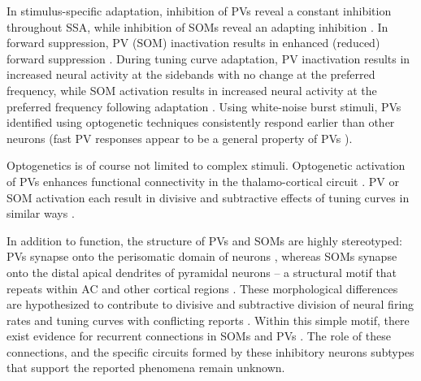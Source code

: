 \documentclass[a4paper,10pt]{article}
\begin{document}
In stimulus-specific adaptation, inhibition of PVs reveal a constant inhibition throughout SSA, while inhibition of SOMs reveal an adapting inhibition \cite{natan2015complementary}. In forward suppression, PV (SOM) inactivation results in enhanced (reduced) forward suppression \cite{phillips2017cortical}. During tuning curve adaptation, PV inactivation results in increased neural activity at the sidebands with no change at the preferred frequency, while SOM activation results in increased neural activity at the preferred frequency following adaptation \cite{natan2017cortical}. Using white-noise burst stimuli, PVs identified using optogenetic techniques consistently respond earlier than other neurons \cite{keller2018gap} (fast PV responses appear to be a general property of PVs \cite{li2014feedforward}).

Optogenetics is of course not limited to complex stimuli. Optogenetic activation of PVs enhances functional connectivity in the thalamo-cortical circuit \cite{hamilton2013optogenetic}. PV or SOM activation each result in divisive and subtractive effects of tuning curves in similar ways \cite{phillips2016asymmetric,phillips2017diverse}.

In addition to function, the structure of PVs and SOMs are highly stereotyped: PVs synapse onto the perisomatic domain of neurons \cite{}, whereas SOMs synapse onto the distal apical dendrites of pyramidal neurons \cite{} -- a structural motif that repeats within AC \cite{} and other cortical regions \cite{}. These morphological differences are hypothesized to contribute to divisive and subtractive division of neural firing rates and tuning curves with conflicting reports \cite{}. Within this simple motif, there exist evidence for recurrent connections in SOMs \cite{} and PVs \cite{}. The role of these connections, and the specific circuits formed by these inhibitory neurons subtypes that support the reported phenomena remain unknown.





\end{document}
